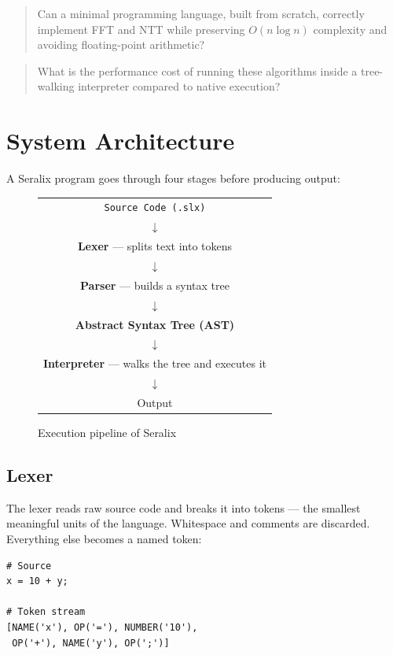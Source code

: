 \documentclass[conference]{IEEEtran}
\begin{document}
\begin{quote}
Can a minimal programming language, built from scratch, correctly implement FFT and NTT while preserving $O(n \log n)$ complexity and avoiding floating-point arithmetic?
\end{quote}

\begin{quote}
What is the performance cost of running these algorithms inside a tree-walking interpreter compared to native execution?
\end{quote}

\section{System Architecture}

A Seralix program goes through four stages before producing output:

\begin{figure}[h]
\centering
\begin{tabular}{c}
\texttt{Source Code (.slx)} \\
$\downarrow$ \\
\textbf{Lexer} — splits text into tokens \\
$\downarrow$ \\
\textbf{Parser} — builds a syntax tree \\
$\downarrow$ \\
\textbf{Abstract Syntax Tree (AST)} \\
$\downarrow$ \\
\textbf{Interpreter} — walks the tree and executes it \\
$\downarrow$ \\
Output
\end{tabular}
\caption{Execution pipeline of Seralix}
\end{figure}

\subsection{Lexer}

The lexer reads raw source code and breaks it into tokens — the smallest meaningful units of the language. Whitespace and comments are discarded. Everything else becomes a named token:

\begin{lstlisting}
# Source
x = 10 + y;

# Token stream
[NAME('x'), OP('='), NUMBER('10'),
 OP('+'), NAME('y'), OP(';')]
\end{lstlisting}
\end{document}
